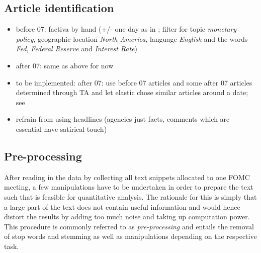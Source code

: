 \subsection{Article identification}\label{subsec:ArticleID}


\begin{itemize}
	\item before 07: factiva by hand (+/- one day as in \textcite{Ellingsen.2003}; filter for topic \textit{monetary policy}, geographic location \textit{North America}, language \textit{English} and the words \textit{Fed}, \textit{Federal Reserve} and \textit{Interest Rate})
	\item after 07: same as above for now
	\item to be implemented: after 07: use before 07 articles and some after 07 articles determined through TA and let elastic chose similar articles around a date; see \textcite{Elastic.2015} 
	\item refrain from using headlines (agencies just facts, comments which are essential have satirical touch)
\end{itemize}
%


\subsection{Pre-processing}

After reading in the data by collecting all text snippets allocated to one FOMC meeting, a few manipulations have to be undertaken in order to prepare the text such that is feasible for quantitative analysis. The rationale for this is simply that a large part of the text does not contain useful information and would hence distort the results by adding too much noise and taking up computation power. This procedure is commonly referred to as \textit{pre-processing} and entails the removal of stop words and stemming as well as manipulations depending on the respective task.

